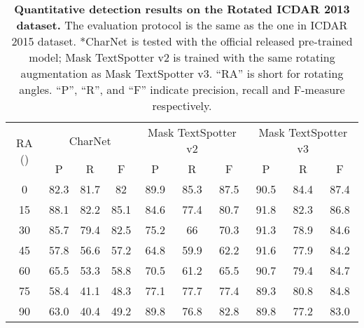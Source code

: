 \documentclass[runningheads]{llncs}
\begin{document}
\begin{table*}[ht]
    \setlength{\tabcolsep}{8.0pt}
    \label{tab:rotated_ic13_det}
    \centering
    \caption{\textbf{Quantitative detection results on the Rotated ICDAR 2013 dataset.} The evaluation protocol is the same as the one in ICDAR 2015 dataset. *CharNet is tested with the official released pre-trained model; Mask TextSpotter v2 is trained with the same rotating augmentation as Mask TextSpotter v3. ``RA'' is short for rotating angles. ``P'', ``R'', and ``F'' indicate precision, recall and F-measure respectively.}
    \begin{tabularx}{1.0\textwidth}{c*{9}c}
    \toprule
    \multirow{2}{*}{RA ()} & \multicolumn{3}{c}{CharNet} & \multicolumn{3}{c}{Mask TextSpotter v2} & \multicolumn{3}{c}{Mask TextSpotter v3} \\ \cline{2-10} 
                                     & P       & R       & F       & P           & R           & F           & P          & R          & F         \\
    \midrule
    0                               & 82.3    & 81.7    & 82      & 89.9        & 85.3        & 87.5        & 90.5       & 84.4       & 87.4      \\
    15                              & 88.1    & 82.2    & 85.1    & 84.6        & 77.4        & 80.7        & 91.8       & 82.3       & 86.8      \\
    30                              & 85.7    & 79.4    & 82.5    & 75.2        & 66          & 70.3        & 91.3       & 78.9       & 84.6      \\
    45                              & 57.8    & 56.6    & 57.2    & 64.8        & 59.9        & 62.2        & 91.6       & 77.9       & 84.2      \\
    60                              & 65.5    & 53.3    & 58.8    & 70.5        & 61.2        & 65.5        & 90.7       & 79.4       & 84.7      \\
    75                              & 58.4    & 41.1    & 48.3    & 77.1        & 77.7        & 77.4        & 89.3       & 80.8       & 84.8      \\
    90                              & 63.0      & 40.4    & 49.2    & 89.8        & 76.8        & 82.8        & 89.8       & 77.2       & 83.0  \\
    \bottomrule  
    \end{tabularx}
\end{table*}
\end{document}
